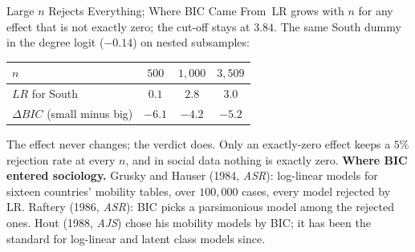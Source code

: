 \documentclass[aspectratio=169,11pt,xcolor=dvipsnames]{beamer}
\newcommand{\core}{\,\raisebox{0.6pt}{\textcolor{corestar}{$\bigstar$}}}
\begin{document}
\begin{frame}{Large $n$ Rejects Everything; Where BIC Came From\core}
LR grows with $n$ for any effect that is not exactly zero; the cut-off
stays at $3.84$. The same South dummy in the degree logit ($-0.14$) on
nested subsamples:
\begin{center}\small
\renewcommand{\arraystretch}{1.0}
\begin{tabular}{lccc}
\toprule
$n$ & $500$ & $1{,}000$ & $3{,}509$ \\
\midrule
$LR$ for South & $0.1$ & $2.8$ & $3.0$ \\
$\Delta BIC$ (small minus big) & $-6.1$ & $-4.2$ & $-5.2$ \\
\bottomrule
\end{tabular}
\end{center}
The effect never changes; the verdict does. Only an exactly-zero effect
keeps a $5\%$ rejection rate at every $n$, and in social data nothing is
exactly zero.
\vskip2pt
\textbf{Where BIC entered sociology.} Grusky and Hauser (1984, \emph{ASR}):
log-linear models for sixteen countries' mobility tables, over
$100{,}000$ cases, every model rejected by LR. Raftery (1986, \emph{ASR}):
BIC picks a parsimonious model among the rejected ones. Hout (1988,
\emph{AJS}) chose his mobility models by BIC; it has been the standard for
log-linear and latent class models since.
\end{frame}
\end{document}
